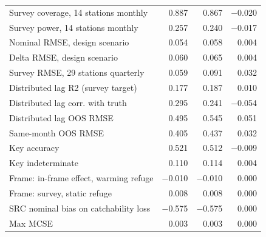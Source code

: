 \begin{tabular}{@{}lrrr@{}}
Survey coverage, 14 stations monthly & 0.887 & 0.867 & $-$0.020 \\
Survey power, 14 stations monthly & 0.257 & 0.240 & $-$0.017 \\
Nominal RMSE, design scenario & 0.054 & 0.058 & 0.004 \\
Delta RMSE, design scenario & 0.060 & 0.065 & 0.004 \\
Survey RMSE, 29 stations quarterly & 0.059 & 0.091 & 0.032 \\
Distributed lag R2 (survey target) & 0.177 & 0.187 & 0.010 \\
Distributed lag corr. with truth & 0.295 & 0.241 & $-$0.054 \\
Distributed lag OOS RMSE & 0.495 & 0.545 & 0.051 \\
Same-month OOS RMSE & 0.405 & 0.437 & 0.032 \\
Key accuracy & 0.521 & 0.512 & $-$0.009 \\
Key indeterminate & 0.110 & 0.114 & 0.004 \\
Frame: in-frame effect, warming refuge & $-$0.010 & $-$0.010 & 0.000 \\
Frame: survey, static refuge & 0.008 & 0.008 & 0.000 \\
SRC nominal bias on catchability loss & $-$0.575 & $-$0.575 & 0.000 \\
Max MCSE & 0.003 & 0.003 & 0.000 \\
\bottomrule
\end{tabular}
